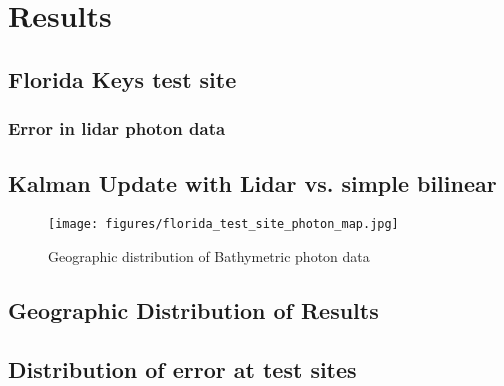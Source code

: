 \chapter{Results}
\section{Florida Keys test site}
\subsection{Error in lidar photon data}





\section{Kalman Update with Lidar vs. simple bilinear}

\begin{figure}[h!]
    \centering
    \texttt{[image: figures/florida\_test\_site\_photon\_map.jpg]}
    \caption{Geographic distribution of Bathymetric photon data}
    \label{bathyphotonmap}
\end{figure}


\section{Geographic Distribution of Results}
\section{Distribution of error at test sites}
